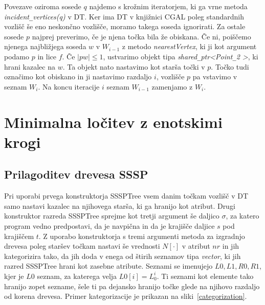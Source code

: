 \documentclass[a4paper, 12pt]{book}
\newcommand{\U}{\texttt{\_}}
\begin{document}
Povezave oziroma sosede $q$ najdemo s krožnim iteratorjem, ki ga vrne metoda \textit{incident\U vertices(q)} v DT. Ker ima DT v knjižnici CGAL poleg standardnih vozlišč še eno neskončno vozlišče, moramo takega soseda ignorirati. Za ostale sosede $p$ najprej preverimo, če je njena točka bila že obiskana. Če ni, poiščemo njenega najbližjega soseda $w$ v $W_{i-1}$ z metodo \textit{nearestVertex}, ki ji kot argument podamo $p$ in lice $f$. Če $|pw|\le 1$, ustvarimo objekt tipa \textit{shared\U ptr\textless Point\U 2 \textgreater}, ki hrani kazalec na $w$. Ta objekt nato nastavimo kot starša točki v $p$. Točko tudi označimo kot obiskano in ji nastavimo razdaljo $i$, vozlišče $p$ pa vstavimo v seznam $W_i$. Na koncu iteracije $i$ seznam $W_{i-1}$ zamenjamo z $W_i$.

\section{Minimalna ločitev z enotskimi krogi}
\subsection{Prilagoditev drevesa SSSP}

Pri uporabi prvega konstruktorja SSSPTree vsem danim točkam vozlišč v DT samo nastavi kazalec na njihovega starša, ki ga hranijo kot atribut. Drugi konstruktor razreda SSSPTree sprejme kot tretji argument še daljico $\sigma$, za katero program vedno predpostavi, da je navpična in da je krajišče daljice $s$ pod krajiščem $t$. Z uporabo konstruktorja s tremi argumenti metoda za izgradnjo drevesa poleg staršev točkam nastavi še vrednosti $N[\cdot]$ v atribut $nr$ in jih kategorizira tako, da jih doda v enega od štirih seznamov tipa \textit{vector}, ki jih razred SSSPTree hrani kot zasebne atribute. Seznami se imenujejo $L0, L1, R0, R1$, kjer je $L0$ seznam, za katerega velja $L0[i] = L_0^i$. Ti seznami kot elemente tako hranijo zopet sezname, šele ti pa dejansko hranijo točke glede na njihovo razdaljo od korena drevesa. Primer kategorizacije je prikazan na sliki~\ref{categorization}.
\end{document}
